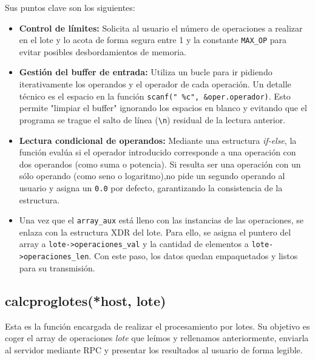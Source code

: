 \documentclass[a4paper,12pt]{article}
\begin{document}
		Sus puntos clave son los siguientes:
		\begin{itemize}
			\item \textbf{Control de límites:} Solicita al usuario el número de operaciones a realizar en el lote y lo acota de forma segura entre 1 y la constante \texttt{MAX\_OP} para evitar posibles desbordamientos de memoria.

			\item \textbf{Gestión del buffer de entrada:} Utiliza un bucle para ir pidiendo iterativamente los operandos y el operador de cada operación. Un detalle técnico es el espacio en la función \texttt{scanf(" \%c", \&oper.operador)}. Esto permite "limpiar el buffer" ignorando los espacios en blanco y evitando que el programa se trague el salto de línea (\texttt{\textbackslash n}) residual de la lectura anterior.
			
			\item \textbf{Lectura condicional de operandos:} Mediante una estructura \textit{if-else}, la función evalúa si el operador introducido corresponde a una operación con dos operandos (como suma o potencia). Si resulta ser una operación con un sólo operando (como seno o logaritmo),no pide un segundo operando al usuario y asigna un \texttt{0.0} por defecto, garantizando la consistencia de la estructura.
			
			\item Una vez que el \texttt{array\_aux} está lleno con las instancias de las operaciones, se enlaza con la estructura XDR del lote. Para ello, se asigna el puntero del array a \texttt{lote->operaciones\_val} y la cantidad de elementos a \texttt{lote->operaciones\_len}. Con este paso, los datos quedan empaquetados y listos para su transmisión.
			
		\end{itemize}	
	
	\subsection{calcproglotes(*host, lote)}
		Esta es la función encargada de realizar el procesamiento por lotes. Su objetivo es coger el array de operaciones \textit{lote} que leímos y rellenamos anteriormente, enviarla al servidor mediante RPC y presentar los resultados al usuario de forma legible.
		
\end{document}
